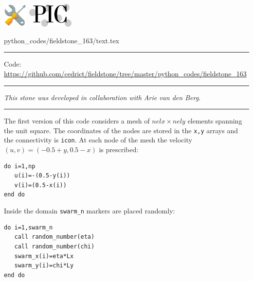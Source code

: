 \noindent
\includegraphics[height=1.25cm]{images/pictograms/tools}
\includegraphics[height=1.25cm]{images/pictograms/pic}


\begin{flushright} {\tiny {\color{gray} python\_codes/fieldstone\_163/text.tex}} \end{flushright}

%

\par\noindent\rule{\textwidth}{0.4pt}

\begin{center}
\infortran
{\small Code: \url{https://github.com/cedrict/fieldstone/tree/master/python_codes/fieldstone_163}}
\end{center}

\par\noindent\rule{\textwidth}{0.4pt}

{\sl This stone was developed in collaboration with Arie van den Berg}. 

\par\noindent\rule{\textwidth}{0.4pt}


The first version of this code considers a mesh of $nelx \times nely$ elements spanning the unit square.
The coordinates of the nodes are stored in the \verb|x,y| arrays and the connectivity is \verb|icon|. 
At each node of the mesh the velocity $(u,v)=(-0.5+y,0.5-x)$ is prescribed:
\begin{verbatim}
do i=1,np
   u(i)=-(0.5-y(i))
   v(i)=(0.5-x(i))
end do
\end{verbatim}

Inside the domain \verb|swarm_n| markers are placed randomly:
\begin{verbatim}
do i=1,swarm_n
   call random_number(eta)
   call random_number(chi)
   swarm_x(i)=eta*Lx
   swarm_y(i)=chi*Ly
end do
\end{verbatim}


